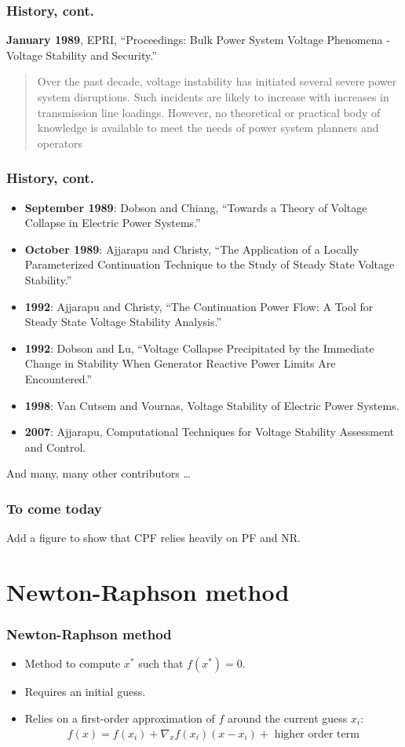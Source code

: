 \documentclass{beamer}
\begin{document}
\begin{frame}
  \frametitle{History, cont.}
\textbf{January 1989}, EPRI, “Proceedings: Bulk Power System Voltage Phenomena - Voltage Stability and Security.”
  \begin{quote}
    Over the past decade, voltage instability has initiated several severe power system disruptions. Such incidents are likely to increase with increases in transmission line loadings. However, no theoretical or practical body of knowledge is available to meet the needs of power system planners and operators
  \end{quote}
\end{frame}


\begin{frame}
  \frametitle{History, cont.}
  \begin{itemize}
  \item \textbf{September 1989}: Dobson and Chiang, “Towards a Theory of Voltage Collapse in Electric Power Systems.”
  \item \textbf{October 1989}: Ajjarapu and Christy, “The Application of a Locally Parameterized Continuation Technique to the Study of Steady State Voltage Stability.”
  \item \textbf{1992}: Ajjarapu and Christy, “The Continuation Power Flow: A Tool for Steady State Voltage Stability Analysis.”
  \item \textbf{1992}: Dobson and Lu, “Voltage Collapse Precipitated by the Immediate Change in Stability When Generator Reactive Power Limits Are Encountered.”
  \item \textbf{1998}: Van Cutsem and Vournas, Voltage Stability of Electric Power Systems.
  \item \textbf{2007}: Ajjarapu, Computational Techniques for Voltage Stability Assessment and Control.
  \end{itemize}
And many, many other contributors \ldots
\end{frame}

\begin{frame}
  \frametitle{To come today}
Add a figure to show that CPF relies heavily on PF and NR.
\end{frame}

\section[NR method]{Newton-Raphson method}
\label{sec:newt-raphs-meth}


\begin{frame}
  \frametitle{Newton-Raphson method}
  \begin{itemize}
  \item Method to compute $x^{*}$ such that $f(x^{*}) = 0$.
  \item Requires an initial guess.
  \item Relies on a first-order approximation of $f$ around the current guess $x_i$:
    \begin{align}
      f(x) = f(x_i) + \nabla_x f(x_i) (x-x_i) + \text{ higher order term}
    \end{align}
  \end{itemize}
\end{frame}
\end{document}
